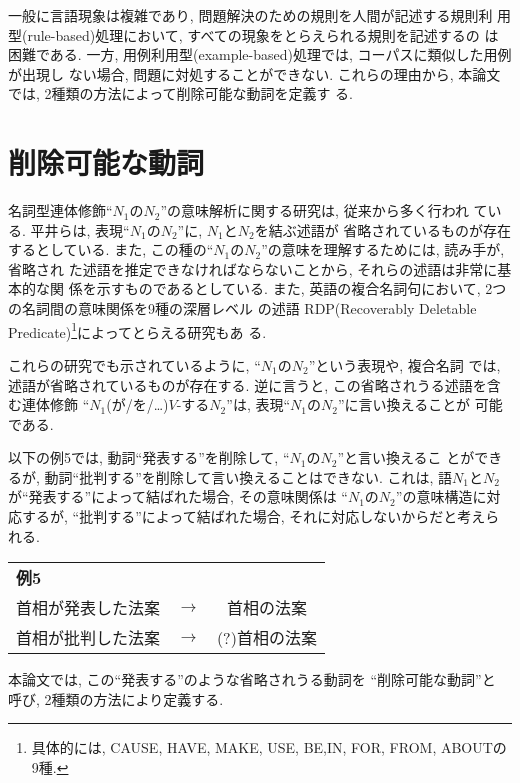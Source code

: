 一般に言語現象は複雑であり, 問題解決のための規則を人間が記述する規則利
用型(rule-based)処理において, すべての現象をとらえられる規則を記述するの
は困難である.
一方, 用例利用型(example-based)処理では, コーパスに類似した用例が出現し
ない場合, 問題に対処することができない.
これらの理由から, 本論文では, 2種類の方法によって削除可能な動詞を定義す
る.

\section{削除可能な動詞}\label{deletable_verb}
名詞型連体修飾``$N_1のN_2$''の意味解析に関する研究は, 従来から多く行われ
ている\cite{hirai86,kokugo51,kurohashi99,shimadu85,tomiura95}. 
平井ら\cite{hirai86}は,  表現``$N_1のN_2$''に, $N_1$と$N_2$を結ぶ述語が
省略されているものが存在するとしている. 
また, この種の``$N_1のN_2$''の意味を理解するためには, 読み手が, 省略され
た述語を推定できなければならないことから, それらの述語は非常に基本的な関
係を示すものであるとしている. 
また, 英語の複合名詞句において, 2つの名詞間の意味関係を9種の深層レベル
の述語 RDP(Recoverably Deletable Predicate)\footnote{具体的には, CAUSE,
HAVE, MAKE, USE, BE,IN, FOR, FROM, ABOUTの9種. }によってとらえる研究もあ
る\cite{levi78}. 

これらの研究でも示されているように, ``$N_1のN_2$''という表現や, 複合名詞
では, 述語が省略されているものが存在する. 
逆に言うと, この省略されうる述語を含む連体修飾 
``$N_1$(が/を/…)$V$-する$N_2$''は, 表現``$N_1のN_2$''に言い換えることが
可能である.

以下の例5では, 動詞``発表する''を削除して, ``$N_1のN_2$''と言い換えるこ
とができるが, 動詞``批判する''を削除して言い換えることはできない. 
これは, 語$N_1$と$N_2$が``発表する''によって結ばれた場合, その意味関係は
``$N_1のN_2$''の意味構造に対応するが, ``批判する''によって結ばれた場合, 
それに対応しないからだと考えられる. 
\begin{center}
\begin{tabular}{lcc}
{\bf 例5} &&\\
首相が発表した法案 & $\to$ & 首相の法案\\
首相が批判した法案 & $\to$ &  (?)首相の法案
\end{tabular}
\end{center}

本論文では, この``発表する''のような省略されうる動詞を ``削除可能な動詞''と
呼び, 2種類の方法により定義する.

